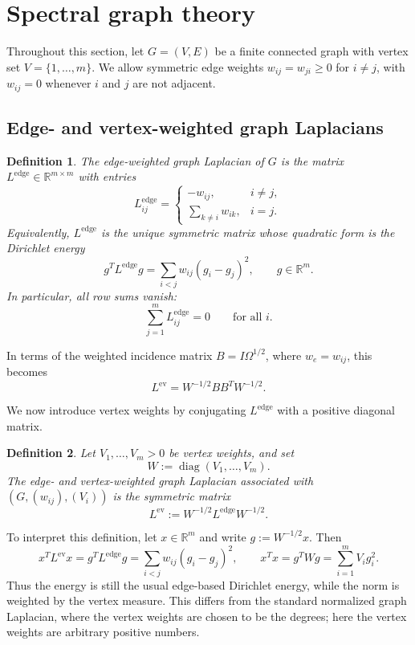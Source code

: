 \documentclass{article}
\newtheorem{definition}{Definition}[section]
\begin{document}
\section{Spectral graph theory}
\label{sec.graphs}

Throughout this section, let \(G=(V,E)\) be a finite connected graph with vertex set \(V=\{1,\ldots,m\}\). We allow symmetric edge weights \(w_{ij}=w_{ji}\geq 0\) for \(i\neq j\), with \(w_{ij}=0\) whenever \(i\) and \(j\) are not adjacent.


\subsection{Edge- and vertex-weighted graph Laplacians}
\label{sec:edge-vertex-laplacian}

\begin{definition}
The \emph{edge-weighted graph Laplacian} of \(G\) is the matrix
\(L^{\mathrm{edge}}\in\mathbb{R}^{m\times m}\) with entries
\[
L^{\mathrm{edge}}_{ij}
=
\begin{cases}
-w_{ij}, & i\neq j,\\[4pt]
\displaystyle\sum_{k\neq i}w_{ik}, & i=j.
\end{cases}
\]
Equivalently, \(L^{\mathrm{edge}}\) is the unique symmetric matrix whose quadratic form is the Dirichlet energy
\[
g^T L^{\mathrm{edge}}g
=
\sum_{i<j}w_{ij}(g_i-g_j)^2,
\qquad g\in\mathbb{R}^m.
\]
In particular, all row sums vanish:
\[
\sum_{j=1}^m L^{\mathrm{edge}}_{ij}=0
\qquad
\text{for all } i.
\]
\end{definition}
In terms of the weighted incidence matrix \(B=I\Omega^{1/2}\), where \(w_e=w_{ij}\), this becomes
\[
L^{\mathrm{ev}}
=
W^{-1/2}BB^T W^{-1/2}.
\]

We now introduce vertex weights by conjugating \(L^{\mathrm{edge}}\) with a positive diagonal matrix.

\begin{definition}
\label{def.vertex.edge.weighted.laplacian}
Let \(V_1,\ldots,V_m>0\) be \emph{vertex weights}, and set
\[
W:=\operatorname{diag}(V_1,\ldots,V_m).
\]
The \emph{edge- and vertex-weighted graph Laplacian} associated with
\((G,(w_{ij}),(V_i))\) is the symmetric matrix
\[
L^{\mathrm{ev}}:=W^{-1/2}L^{\mathrm{edge}}W^{-1/2}.
\]
\end{definition}

To interpret this definition, let \(x\in\mathbb{R}^m\) and write \(g:=W^{-1/2}x\). Then
\[
x^T L^{\mathrm{ev}}x
=
g^T L^{\mathrm{edge}}g
=
\sum_{i<j}w_{ij}(g_i-g_j)^2,
\qquad
x^Tx
=
g^TWg
=
\sum_{i=1}^m V_i g_i^2.
\]
Thus the energy is still the usual edge-based Dirichlet energy, while the norm is weighted by the vertex measure. This differs from the standard normalized graph Laplacian, where the vertex weights are chosen to be the degrees; here the vertex weights are arbitrary positive numbers.
\end{document}
